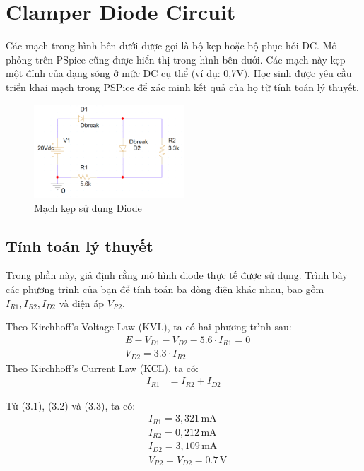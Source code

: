 \section{Clamper Diode Circuit}

Các mạch trong hình bên dưới được gọi là bộ kẹp hoặc bộ phục hồi DC. Mô phỏng trên PSpice cũng được hiển thị trong hình bên dưới. Các mạch này kẹp một đỉnh của dạng sóng ở mức DC cụ thể (ví dụ: 0,7V). Học sinh được yêu cầu triển khai mạch trong PSPice để xác minh kết quả của họ từ tính toán lý thuyết.

\begin{figure}[h]
    \centering
    \includegraphics[width=0.5\textwidth]{graphics/ex4/f1.PNG}
    \caption{Mạch kẹp sử dụng Diode}
\end{figure}

\subsection{Tính toán lý thuyết}

Trong phần này, giả định rằng mô hình diode thực tế được sử dụng. Trình bày các phương trình của bạn để tính toán ba dòng điện khác nhau, bao gồm $I_{R1}, I_{R2}, I_{D2}$ và điện áp $V_{R2}$.

Theo Kirchhoff’s Voltage Law (KVL), ta có hai phương trình sau:
\begin{align}
    &E - V_{D1} - V_{D2} - 5.6 \cdot I_{R1} = 0 \\
    &V_{D2} = 3.3 \cdot I_{R2}
\end{align}
Theo Kirchhoff’s Current Law (KCL), ta có:
\begin{align}
    I_{R1} &= I_{R2} + I_{D2}
\end{align}

Từ (3.1), (3.2) và (3.3), ta có:
\begin{align*}
    &I_{R1} = 3,321 \, \text{mA} \\
    &I_{R2} = 0,212 \, \text{mA} \\
    &I_{D2} = 3,109 \, \text{mA} \\
    &V_{R2} = V_{D2} = 0.7 \, \text{V}
\end{align*}

